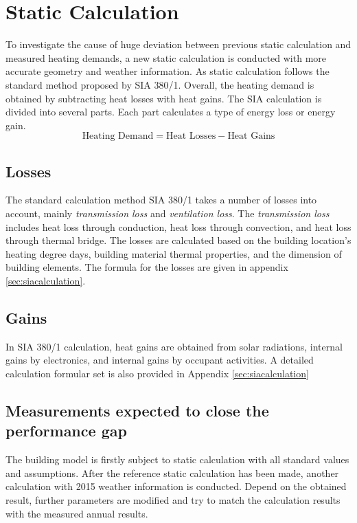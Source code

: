\documentclass[a4paper, oneside]{discothesis}
\begin{document}
	\section{Static Calculation}
		To investigate the cause of huge deviation between previous static calculation and measured heating demands, a new static calculation is conducted with more accurate geometry and weather information. As static calculation follows the standard method proposed by SIA 380/1. Overall, the heating demand is obtained by subtracting heat losses with heat gains. The SIA calculation is divided into several parts. Each part calculates a type of energy loss or energy gain. \\
		\[\text{Heating Demand} = \text{Heat Losses} - \text{Heat Gains}\]
		
		\subsection{Losses}
			The standard calculation method SIA 380/1 takes a number of losses into account, mainly \textit{transmission loss} and \textit{ventilation loss}. The \textit{transmission loss} includes heat loss through conduction, heat loss through convection, and heat loss through thermal bridge. The losses are calculated based on the building location's heating degree days, building material thermal properties, and the dimension of building elements. The formula for the losses are given in appendix \ref{sec:siacalculation}.\\

		\subsection{Gains}
			In SIA 380/1 calculation, heat gains are obtained from solar radiations, internal gains by electronics, and internal gains by occupant activities. A detailed calculation formular set is also provided in Appendix \ref{sec:siacalculation}
			
		\subsection{Measurements expected to close the performance gap}
			The building model is firstly subject to static calculation with all standard values and assumptions. After the reference static calculation has been made, another calculation with 2015 weather information is conducted. Depend on the obtained result, further parameters are modified and try to match the calculation results with the measured annual results.
\end{document}
